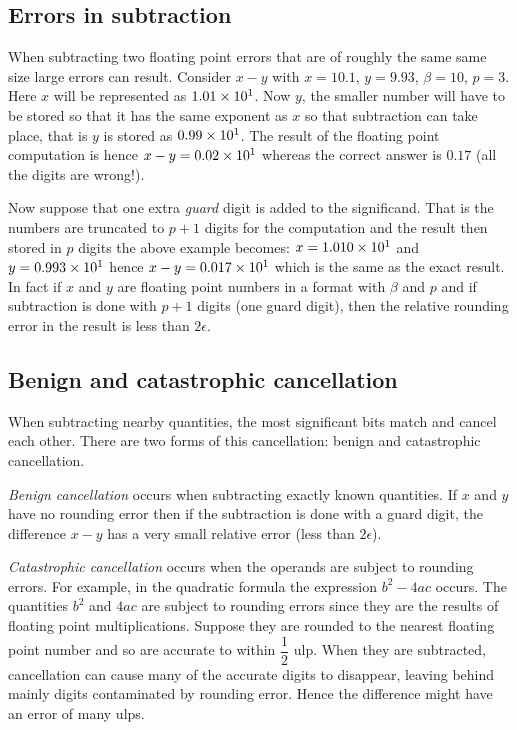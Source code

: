 \subsection{Errors in subtraction}

When subtracting two floating point errors that are of roughly the same same
size large errors can result. Consider $x-y$ with $x=10.1$, $y=9.93$,
$\beta=10$, $p=3$. Here $x$ will be represented as $1.01 \times  10^{1}  $. Now $y$,
the smaller number will have to be stored so that it has the same exponent as
$x$ so that subtraction can take place, that is $y$ is stored as
$0.99 \times  10^{1}  $. The result of the floating point computation is hence
$x-y=0.02 \times  10^{1}  $ whereas the correct answer is $0.17$ (\ie all the digits
are wrong!).

Now suppose that one extra \emph{guard} digit is added to the
significand. That is the numbers are truncated to $p+1$ digits for the
computation and the result then stored in $p$ digits the above example
becomes: $x=1.010 \times  10^{1}  $ and $y=0.993 \times  10^{1}  $ hence
$x-y=0.017 \times  10^{1}  $ which is the same as the exact result. In fact if $x$
and $y$ are floating point numbers in a format with $\beta$ and $p$ and if
subtraction is done with $p+1$ digits (\ie one guard digit), then the
relative rounding error in the result is less than $2\epsilon$.

\subsection{Benign and catastrophic cancellation}

When subtracting nearby quantities, the most significant bits match and
cancel each other. There are two forms of this cancellation: benign and
catastrophic cancellation. 

\emph{Benign cancellation} occurs when subtracting exactly known quantities.
If $x$ and $y$ have no rounding error then if the subtraction is done with a
guard digit, the difference $x-y$ has a very small relative error (less than
$2\epsilon$).

\emph{Catastrophic cancellation} occurs when the operands are subject to
rounding errors. For example, in the quadratic formula the expression $b^{2} -
4ac$ occurs. The quantities $b^{2}$ and $4ac$ are subject to rounding errors
since they are the results of floating point multiplications. Suppose they are
rounded to the nearest floating point number and so are accurate to within
$\dfrac{1}{2}$ ulp. When they are subtracted, cancellation can cause many of
the accurate digits to disappear, leaving behind mainly digits contaminated by
rounding error. Hence the difference might have an error of many ulps.

